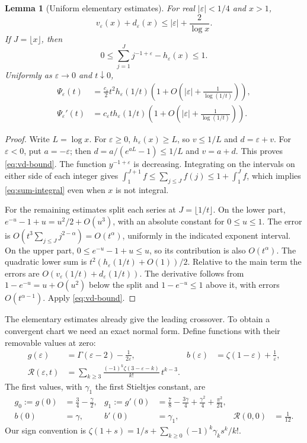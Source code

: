 \documentclass[11pt,a4paper]{article}
\numberwithin{equation}{section}
\newtheorem{lemma}[theorem]{Lemma}
\theoremstyle{definition}
\theoremstyle{remark}
\newcommand{\eps}{\varepsilon}
\newcommand{\cR}{\mathcal R}
\begin{document}
\begin{lemma}[Uniform elementary estimates]
\label{lem:elementary}
For real \(|\eps|<1/4\) and \(x>1\),
\begin{equation}
 v_\eps(x)+d_\eps(x)\le |\eps|+\frac2{\log x}.
 \label{eq:vd-bound}
\end{equation}
If \(J=\lfloor x\rfloor\), then
\begin{equation}
 0\le\sum_{j=1}^Jj^{-1+\eps}-h_\eps(x)\le1.
 \label{eq:sum-integral}
\end{equation}
Uniformly as \(\eps\to0\) and \(t\downarrow0\),
\begin{align}
 \Psi_\eps(t)&=\frac{c_\eps}{2}t^2h_\eps(1/t)
 \left(1+O\left(|\eps|+\frac1{\log(1/t)}\right)\right), \label{eq:psi-leading}\\
 \Psi_\eps'(t)&=c_\eps t h_\eps(1/t)
 \left(1+O\left(|\eps|+\frac1{\log(1/t)}\right)\right).
 \label{eq:psi-prime-leading}
\end{align}
\end{lemma}
\begin{proof}
Write \(L=\log x\). For \(\eps\ge0\), \(h_\eps(x)\ge L\), so
\(v\le1/L\) and \(d=\eps+v\). For \(\eps<0\), put \(a=-\eps\); then
\(d=a/(e^{aL}-1)\le1/L\) and \(v=a+d\). This proves
\eqref{eq:vd-bound}. The function \(y^{-1+\eps}\) is decreasing. Integrating
on the intervals on either side of each integer gives
\(\int_1^{J+1}f\le\sum_{j\le J}f(j)\le1+\int_1^Jf\), which implies
\eqref{eq:sum-integral} even when \(x\) is not integral.

For the remaining estimates split each series at \(J=\lfloor1/t\rfloor\).
On the lower part,
\(e^{-u}-1+u=u^2/2+O(u^3)\), with an absolute constant for \(0\le u\le1\).
The error is
\(O(t^3\sum_{j\le J}j^{2-\alpha})=O(t^\alpha)\), uniformly in the indicated
exponent interval. On the upper part, \(0\le e^{-u}-1+u\le u\), so its
contribution is also \(O(t^\alpha)\). The quadratic lower sum is
\(t^2(h_\eps(1/t)+O(1))/2\). Relative to the main term the errors are
\(O(v_\eps(1/t)+d_\eps(1/t))\). The derivative follows from
\(1-e^{-u}=u+O(u^2)\) below the split and \(1-e^{-u}\le1\) above it, with
errors \(O(t^{\alpha-1})\). Apply \eqref{eq:vd-bound}.
\end{proof}

The elementary estimates already give the leading crossover. To obtain a
convergent chart we need an exact normal form. Define functions with their
removable values at zero:
\begin{align}
 g(\eps)&=\Gamma(\eps-2)-\frac1{2\eps},&
 b(\eps)&=\zeta(1-\eps)+\frac1\eps, \label{eq:regularparts}\\
 \cR(\eps,t)&=\sum_{k\ge3}
 \frac{(-1)^k\zeta(3-\eps-k)}{k!}\,t^{k-3}. \label{eq:R}
\end{align}
The first values, with \(\gamma_1\) the first Stieltjes constant, are
\begin{align}
 g_0:=g(0)&=\frac34-\frac\gamma2,&
 g_1:=g'(0)&=\frac78-\frac{3\gamma}4+\frac{\gamma^2}4+\frac{\pi^2}{24},
 \label{eq:g-values}\\
 b(0)&=\gamma,& b'(0)&=\gamma_1,& \cR(0,0)&=\frac1{12}. \nonumber
\end{align}
Our sign convention is
\(\zeta(1+s)=1/s+\sum_{k\ge0}(-1)^k\gamma_k s^k/k!\).
\end{document}
